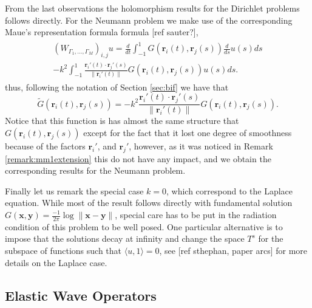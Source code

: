 \documentclass{article}
\newcommand{\todo}[1]{{\color{red}[#1]}}
\newcommand{\br}{\bm{r}}
\newcommand{\bx}{\bm{x}}
\newcommand{\by}{\bm{y}}
\begin{document}
From the last observations the holomorphism results for the Dirichlet problems follows directly. For the Neumann problem we make use of the corresponding Maue's representation formula  formula \todo{ref sauter?},
\begin{align*}
\begin{split}
(W_{\Gamma_1,\hdots,\Gamma_M})_{i,j}u = \frac{d}{dt} \int_{-1}^1 G(\br_i(t),\br_j(s)) \frac{d}{ds} u(s) ds \\- k^2\int_{-1}^1 \frac{\br_i'(t)\cdot \br_j'(s)}{\|\br_i'(t)\|} G(\br_i(t),\br_j(s))u(s) ds. 
\end{split}
\end{align*} 
thus, following the notation of Section \ref{sec:bif} we have that 
$$
\widetilde{G}(\br_i(t),\br_j(s)) = -k^2 \frac{\br_i'(t)\cdot \br_j'(s)}{\|\br_i'(t)\|} G(\br_i(t),\br_j(s)).
$$
Notice that this function is has almost the same structure that $G(\br_i(t),\br_j(s))$ except for the fact that it lost one degree of smoothness because of the factors $\br_i'$, and $\br_j'$, however, as it was noticed in Remark \ref{remark:mm1extension} this do not have any impact, and we obtain the corresponding results for the Neumann problem.

Finally let us remark the special case $k=0$, which correspond to the Laplace equation. While most of the result follows directly with fundamental solution $G(\bx,\by) = \frac{-1}{2\pi} \log \| \bx - \by \|$, special care has to be put in the radiation condition of this problem to be well posed. One particular alternative is to impose that the solutions decay at infinity and change the space $T^s$ for the subspace of functions such that $\langle u, 1 \rangle = 0$, see \todo{ref sthephan, paper arcs} for more details on the Laplace case. 
\subsection{Elastic Wave Operators}
\end{document}
